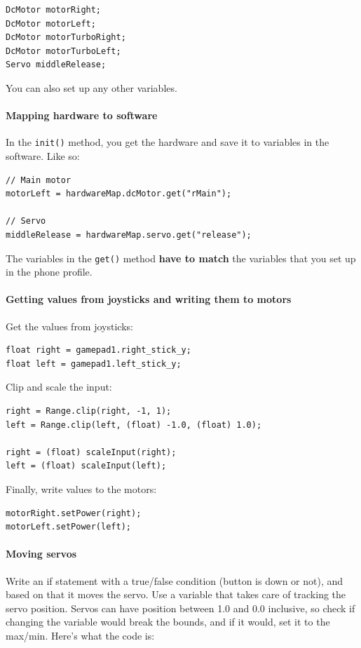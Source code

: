 \documentclass[12p,a4paper]{article}
\begin{document}
\begin{verbatim}
DcMotor motorRight;
DcMotor motorLeft;
DcMotor motorTurboRight;
DcMotor motorTurboLeft;
Servo middleRelease;
\end{verbatim}

You can also set up any other variables.

\paragraph{Mapping hardware to software}In the \verb!init()! method, you get the hardware and save it to variables in the software. Like so:

\begin{verbatim}
// Main motor
motorLeft = hardwareMap.dcMotor.get("rMain");

// Servo
middleRelease = hardwareMap.servo.get("release");
\end{verbatim}

The variables in the \verb!get()! method \textbf{have to match} the variables that you set up in the phone profile.

\paragraph{Getting values from joysticks and writing them to motors} Get the values from joysticks:

\begin{verbatim}
float right = gamepad1.right_stick_y;
float left = gamepad1.left_stick_y;
\end{verbatim}

Clip and scale the input:

\begin{verbatim}
right = Range.clip(right, -1, 1);
left = Range.clip(left, (float) -1.0, (float) 1.0);
        
right = (float) scaleInput(right);
left = (float) scaleInput(left);
\end{verbatim}

Finally, write values to the motors:

\begin{verbatim}
motorRight.setPower(right);
motorLeft.setPower(left);
\end{verbatim}

\paragraph{Moving servos} Write an if statement with a true/false condition (button is down or not), and based on that it moves the servo. Use a variable that takes care of tracking the servo position. Servos can have position between 1.0 and 0.0 inclusive, so check if changing the variable would break the bounds, and if it would, set it to the max/min. Here's what the code is:
\end{document}
